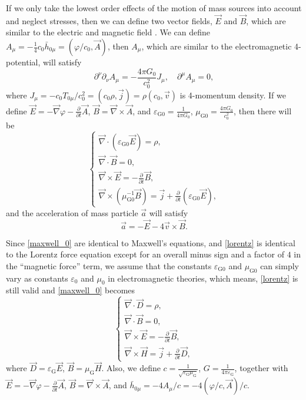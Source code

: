 \documentclass{article}
\def\p{\partial}
\begin{document}
If we only take the lowest order effects of the motion of mass sources into account and neglect stresses, then we can define two vector fields, $\vec{E}$ and $\vec{B}$, which are similar to the electric and magnetic field \cite{Wald1984}. We can define $A_\mu=-\frac{1}{4}c_0\bar{h}_{0 \mu}=(\varphi/c_0,\vec{A})$, then $A_\mu$, which are similar to the electromagnetic 4-potential, will satisfy
\begin{equation}
    \p^\nu\p_\nu A_\mu=-\frac{4\pi G_0}{c_0^2}J_\mu,\quad\p^\mu A_\mu=0,
\end{equation}
where $J_\mu=-c_0T_{0 \mu}/c_0^2=(c_0\rho,\vec{j})=\rho(c_0,\vec{v})$ is 4-momentum density. If we define $\vec{E}=-\vec{\nabla}\varphi-\frac{\p}{\p t}\vec{A}$, $\vec{B}=\vec{\nabla}\times\vec{A}$, and $\varepsilon_{\text{G}0}=\frac{1}{4\pi G_0}$, $\mu_{\text{G}0}=\frac{4\pi G_0}{c_0^2}$, then there will be
\begin{equation}\label{maxwell_0}
    \begin{cases}
        \vec{\nabla}\cdot(\varepsilon_{\text{G}0}\vec{E})=\rho,\\
        \vec{\nabla}\cdot\vec{B}=0,\\
        \vec{\nabla}\times\vec{E}=-\frac{\p}{\p t}\vec{B},\\
        \vec{\nabla}\times(\mu_{\text{G}0}^{-1}\vec{B})=\vec{j}+\frac{\p}{\p t}(\varepsilon_{\text{G}0}\vec{E}),
    \end{cases}
\end{equation}
and the acceleration of mass particle $\vec{a}$ will satisfy
\begin{equation}\label{lorentz}
    \vec{a}=-\vec{E}-4\vec{v}\times\vec{B}.
\end{equation}

Since \eqref{maxwell_0} are identical to Maxwell's equations, and \eqref{lorentz} is identical to the Lorentz force equation except for an overall minus sign and a factor of $4$ in the ``magnetic force'' term, we assume that the constants $\varepsilon_{\text{G}0}$ and $\mu_{\text{G}0}$ can simply vary as constants $\varepsilon_{0}$ and $\mu_{0}$ in electromagnetic theories, which means, \eqref{lorentz} is still valid and \eqref{maxwell_0} becomes
\begin{equation}\label{maxwell}
    \begin{cases}
        \vec{\nabla}\cdot\vec{D}=\rho,\\
        \vec{\nabla}\cdot\vec{B}=0,\\
        \vec{\nabla}\times\vec{E}=-\frac{\p}{\p t}\vec{B},\\
        \vec{\nabla}\times\vec{H}=\vec{j}+\frac{\p}{\p t}\vec{D},
    \end{cases}
\end{equation}
where $\vec{D}=\varepsilon_{\text{G}}\vec{E}$, $\vec{B}=\mu_{\text{G}}\vec{H}$. Also, we define $c=\frac{1}{\sqrt{\varepsilon_{\text{G}}\mu_{\text{G}}}}$, $G=\frac{1}{4\pi\varepsilon_{\text{G}}}$, together with $\vec{E}=-\vec{\nabla}\varphi-\frac{\p}{\p t}\vec{A}$, $\vec{B}=\vec{\nabla}\times\vec{A}$, and $\bar{h}_{0 \mu}=-4A_\mu/c=-4(\varphi/c,\vec{A})/c$.
\end{document}
